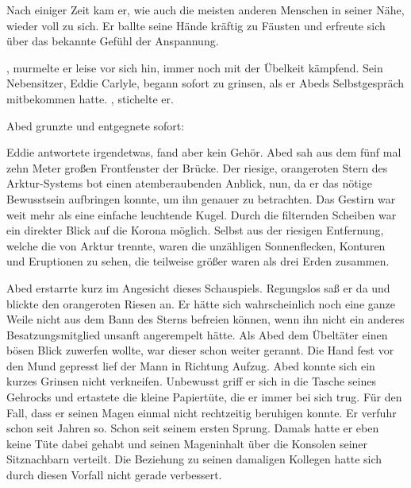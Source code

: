 \par

Nach einiger Zeit kam er, wie auch die meisten anderen Menschen in seiner Nähe, wieder voll zu sich. Er ballte seine Hände kräftig zu Fäusten und erfreute sich über das bekannte Gefühl der Anspannung.

\par

, murmelte er leise vor sich hin, immer noch mit der Übelkeit kämpfend. Sein Nebensitzer, Eddie Carlyle, begann sofort zu grinsen, als er Abeds Selbstgespräch mitbekommen hatte. , stichelte er.

\par

Abed grunzte und entgegnete sofort: 

\par

Eddie antwortete irgendetwas, fand aber kein Gehör. Abed sah aus dem fünf mal zehn Meter großen Frontfenster der Brücke. Der riesige, orangeroten Stern des Arktur-Systems bot einen atemberaubenden Anblick, nun, da er das nötige Bewusstsein aufbringen konnte, um ihn genauer zu betrachten. Das Gestirn war weit mehr als eine einfache leuchtende Kugel. Durch die filternden Scheiben war ein direkter Blick auf die Korona möglich. Selbst aus der riesigen Entfernung, welche die  von Arktur trennte, waren die unzähligen Sonnenflecken, Konturen und Eruptionen zu sehen, die teilweise größer waren als drei Erden zusammen.

\par

Abed erstarrte kurz im Angesicht dieses Schauspiels. Regungslos saß er da und blickte den orangeroten Riesen an. Er hätte sich wahrscheinlich noch eine ganze Weile nicht aus dem Bann des Sterns befreien können, wenn ihn nicht ein anderes Besatzungsmitglied unsanft angerempelt hätte. Als Abed dem Übeltäter einen bösen Blick zuwerfen wollte, war dieser schon weiter gerannt. Die Hand fest vor den Mund gepresst lief der Mann in Richtung Aufzug. Abed konnte sich ein kurzes Grinsen nicht verkneifen. Unbewusst griff er sich in die Tasche seines Gehrocks und ertastete die kleine Papiertüte, die er immer bei sich trug. Für den Fall, dass er seinen Magen einmal nicht rechtzeitig beruhigen konnte. Er verfuhr schon seit Jahren so. Schon seit seinem ersten Sprung. Damals hatte er eben keine Tüte dabei gehabt und seinen Mageninhalt über die Konsolen seiner Sitznachbarn verteilt. Die Beziehung zu seinen damaligen Kollegen hatte sich durch diesen Vorfall nicht gerade verbessert.

